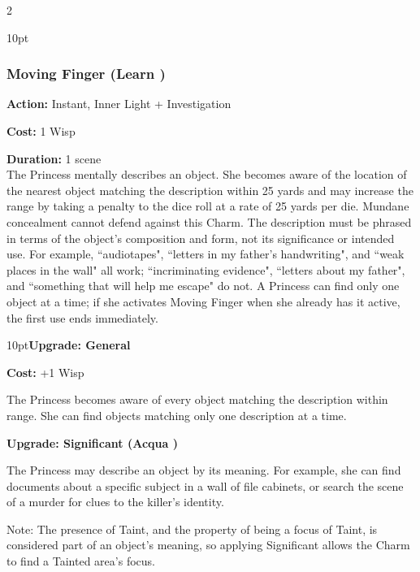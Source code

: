 \begin{multicols}{2}
\begin{myindentpar}{10pt}
\end{myindentpar}

\subsubsection*{Moving Finger (Learn \textbullet\textbullet\textbullet)}

\noindent \textbf{Action:} Instant, Inner Light + Investigation

\noindent \textbf{Cost:} 1 Wisp

\noindent \textbf{Duration:} 1 scene \\

\noindent The Princess mentally describes an object. She becomes aware of the location of the nearest object matching the description within 25 yards and may increase the range by taking a penalty to the dice roll at a rate of 25 yards per die. Mundane concealment cannot defend against this Charm. The description must be phrased in terms of the object's composition and form, not its significance or intended use. For example, \textquotedblleft audiotapes", \textquotedblleft letters in my father's handwriting", and \textquotedblleft weak places in the wall" all work; \textquotedblleft incriminating evidence", \textquotedblleft letters about my father", and \textquotedblleft something that will help me escape" do not. A Princess can find only one object at a time; if she activates Moving Finger when she already has it active, the first use ends immediately.

\begin{myindentpar}{10pt}\textbf{Upgrade: General}

\noindent \textbf{Cost:} +1 Wisp

The Princess becomes aware of every object matching the description within range. She can find objects matching only one description at a time.

\textbf{Upgrade: Significant (Acqua \textbullet\textbullet)}

The Princess may describe an object by its meaning. For example, she can find documents about a specific subject in a wall of file cabinets, or search the scene of a murder for clues to the killer's identity.

Note: The presence of Taint, and the property of being a focus of Taint, is considered part of an object's meaning, so applying Significant allows the Charm to find a Tainted area's focus.\end{myindentpar}



\end{multicols}
